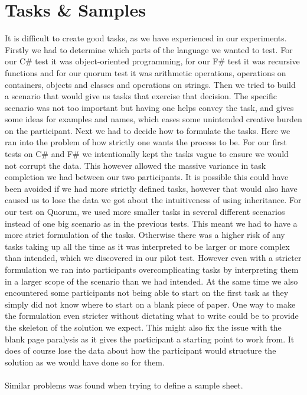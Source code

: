\section{Tasks \& Samples}
\label{Discussion:TaskSamples}
It is difficult to create good tasks, as we have experienced in our experiments.
Firstly we had to determine which parts of the language we wanted to test.
For our C\# test it was object-oriented programming, for our F\# test it was recursive functions and for our quorum test it was arithmetic operations, operations on containers, objects and classes and operations on strings.
Then we tried to build a scenario that would give us tasks that exercise that decision.
The specific scenario was not too important but having one helps convey the task, and gives some ideas for examples and names, which eases some unintended creative burden on the participant.
Next we had to decide how to formulate the tasks.
Here we ran into the problem of how strictly one wants the process to be.
For our first tests on C\# and F\# we intentionally kept the tasks vague to ensure we would not corrupt the data.
This however allowed the massive variance in task completion we had between our two participants.
It is possible this could have been avoided if we had more strictly defined tasks, however that would also have caused us to lose the data we got about the intuitiveness of using inheritance.
For our test on Quorum, we used more smaller tasks in several different scenarios instead of one big scenario as in the previous tests.
This meant we had to have a more strict formulation of the tasks.
Otherwise there was a higher risk of any tasks taking up all the time as it was interpreted to be larger or more complex than intended, which we discovered in our pilot test.
However even with a stricter formulation we ran into participants overcomplicating tasks by interpreting them in a larger scope of the scenario than we had intended.
At the same time we also encountered some participants not being able to start on the first task as they simply did not know where to start on a blank piece of paper.
One way to make the formulation even stricter without dictating what to write could be to provide the skeleton of the solution we expect.
This might also fix the issue with the blank page paralysis as it gives the participant a starting point to work from.
It does of course lose the data about how the participant would structure the solution as we would have done so for them.
\\\\
Similar problems was found when trying to define a sample sheet.

